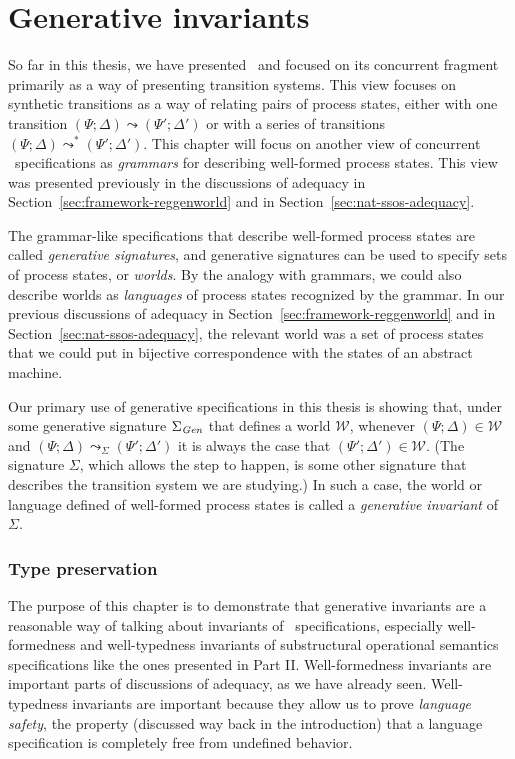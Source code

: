 \chapter{Generative invariants}
\label{chapter-gen}

So far in this thesis, we have presented \sls~and focused on its
concurrent fragment primarily as a way of presenting transition
systems. This view focuses on synthetic transitions as a way of
relating pairs of process states, either with one transition $(\Psi;
\Delta) \leadsto (\Psi'; \Delta')$ or with a series of transitions
$(\Psi; \Delta) \leadsto^* (\Psi'; \Delta')$. This chapter will focus
on another view of concurrent \sls~specifications as {\it grammars}
for describing well-formed process states. This view was presented
previously in the discussions of adequacy in
Section~\ref{sec:framework-reggenworld} and in
Section~\ref{sec:nat-ssos-adequacy}.

The grammar-like specifications that describe well-formed process
states are called {\it generative signatures}, and generative
signatures can be used to specify sets of process states, or {\it
  worlds}. By the analogy with grammars, we could also describe worlds
as {\it languages} of process states recognized by the grammar. In our
previous discussions of adequacy in
Section~\ref{sec:framework-reggenworld} and in
Section~\ref{sec:nat-ssos-adequacy}, the relevant world was a set of
process states that we could put in bijective correspondence with the
states of an abstract machine.

Our primary use of generative specifications in this thesis is showing
that, under some generative signature $\Sigma_{\it Gen}$ that defines
a world $\mathcal W$, whenever $(\Psi; \Delta) \in \mathcal W$ and
$(\Psi; \Delta) \leadsto_\Sigma (\Psi'; \Delta')$ it is always the
case that $(\Psi'; \Delta') \in \mathcal W$.  (The signature $\Sigma$,
which allows the step to happen, is some other signature that describes
the transition system we are studying.)  In such a case, the
world or language defined of well-formed process states is called a
{\it generative invariant} of $\Sigma$.

\subsection*{Type preservation}

The purpose of this chapter is to demonstrate that generative
invariants are a reasonable way of talking about invariants of
\sls~specifications, especially well-formedness and well-typedness
invariants of substructural operational semantics specifications like
the ones presented in Part II. Well-formedness invariants are
important parts of discussions of adequacy, as we have already
seen. Well-typedness invariants are important because they allow us to
prove {\it language safety}, the property (discussed way back in the
introduction) that a language specification is completely free
from undefined behavior.

